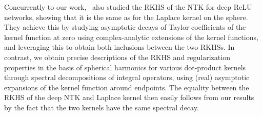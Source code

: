 Concurrently to our work,~\citet{chen2020deep} also studied the RKHS of the NTK for deep ReLU networks, showing that it is the same as for the Laplace kernel on the sphere. They achieve this by studying asymptotic decays of Taylor coefficients of the kernel function at zero using complex-analytic extensions of the kernel functions, and leveraging this to obtain both inclusions between the two RKHSs. In contrast, we obtain precise descriptions of the RKHS and regularization properties in the basis of spherical harmonics for various dot-product kernels through spectral decompositions of integral operators, using (real) asymptotic expansions of the kernel function around endpoints. The equality between the RKHS of the deep NTK and Laplace kernel then easily follows from our results by the fact that the two kernels have the same spectral decay.

